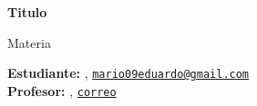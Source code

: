 






\begin{LARGE}
    \textsf{\textbf{Titulo}}
    
    Materia
\end{LARGE}

\vspace{1ex}

\textsf{\textbf{Estudiante:}} , \href{mario09eduardo@gmail.com}{\texttt{mario09eduardo@gmail.com}}\\
\textsf{\textbf{Profesor:}} , \href{correo}{\texttt{correo}}


\vspace{2ex}


